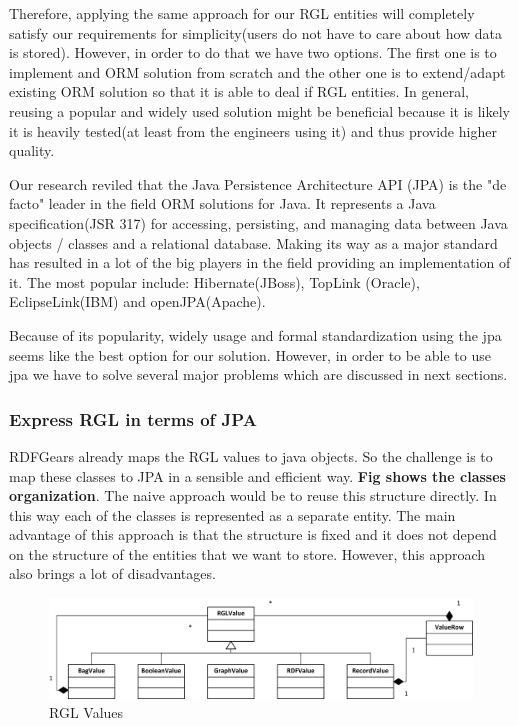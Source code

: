 \documentclass[a4paper, notitlepage]{article}
\begin{document}
Therefore, applying the same approach for our RGL entities will completely satisfy our requirements for simplicity(users do not have to care about how data is stored). However, in order to do that we have two options. The first one is to implement and ORM solution from scratch and the other one is to extend/adapt existing ORM solution so that it is able to deal if RGL entities. In general, reusing a popular and widely used solution might be beneficial because it is likely it is heavily tested(at least from the engineers using it) and thus provide higher quality. 

Our research reviled that the Java Persistence Architecture API (JPA) is the "de facto" leader in the field ORM solutions for Java. It represents a Java specification(JSR 317) for accessing, persisting, and managing data between Java objects / classes and a relational database. Making its way as a major standard has resulted in a lot of the big players in the field providing an implementation of it. The most popular include: Hibernate(JBoss), TopLink (Oracle), EclipseLink(IBM) and openJPA(Apache). 

Because of its popularity, widely usage and formal standardization using the jpa  seems like the best option for our solution. However, in order to be able to use jpa we have to solve several major problems which are discussed in next sections.


\subsubsection{Express RGL in terms of JPA}
RDFGears already maps the RGL values to java objects. So the challenge is to map these classes to JPA in a sensible and efficient way. \textbf{Fig shows the classes organization}. The naive approach would be to reuse this structure directly. In this way each of the classes is represented as a separate entity. The main advantage of this approach is that the structure is fixed and it does not depend on the structure of the entities that we want to store. However, this approach also brings a lot of disadvantages. 

\begin{figure}[h!]
  \centering
  	\includegraphics[scale=0.8]{diagrams/RGLValues.png}
  \caption{RGL Values }
  \label{fig_rglValues}
\end{figure}
\end{document}
